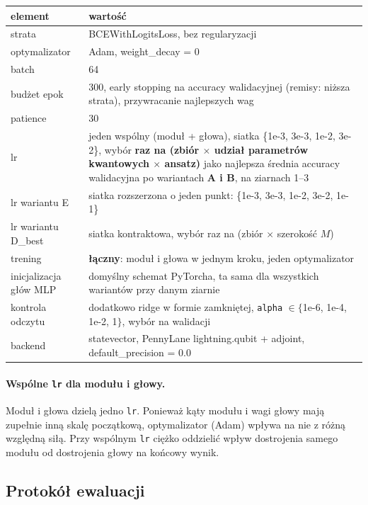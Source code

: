 \documentclass[11pt, a4paper]{article}
\begin{document}
\begin{table}[H]
\centering
\renewcommand{\arraystretch}{1.3}
\begin{tabularx}{\textwidth}{lX}
\toprule
\textbf{element} & \textbf{wartość} \\
\midrule
strata & BCEWithLogitsLoss, bez regularyzacji \\
optymalizator & Adam, weight\_decay = 0 \\
batch & 64 \\
budżet epok & 300, early stopping na accuracy walidacyjnej (remisy: niższa strata), przywracanie najlepszych wag \\
patience & 30 \\
lr & jeden wspólny (moduł + głowa), siatka \{1e-3, 3e-3, 1e-2, 3e-2\}, wybór \textbf{raz na (zbiór $\times$ udział parametrów kwantowych $\times$ ansatz)} jako najlepsza średnia accuracy walidacyjna po wariantach \textbf{A i B}, na ziarnach 1–3 \\
lr wariantu E & siatka rozszerzona o jeden punkt: \{1e-3, 3e-3, 1e-2, 3e-2, 1e-1\}\\
lr wariantu D\_best & siatka kontraktowa, wybór raz na (zbiór $\times$ szerokość $M$) \\
trening & \textbf{łączny}: moduł i głowa w jednym kroku, jeden optymalizator \\
inicjalizacja głów MLP & domyślny schemat PyTorcha, ta sama dla wszystkich wariantów przy danym ziarnie \\
kontrola odczytu & dodatkowo ridge w formie zamkniętej, \texttt{alpha} $\in \{$1e-6, 1e-4, 1e-2, 1$\}$, wybór na walidacji \\
backend & statevector, PennyLane lightning.qubit + adjoint, default\_precision = 0.0 \\
\bottomrule
\end{tabularx}
\end{table}

\paragraph{Wspólne \texttt{lr} dla modułu i głowy.} Moduł i głowa dzielą jedno \texttt{lr}. Ponieważ kąty modułu i wagi głowy mają zupełnie inną skalę początkową, optymalizator (Adam) wpływa na nie z różną względną siłą. Przy wspólnym \texttt{lr} ciężko oddzielić wpływ dostrojenia samego modułu od dostrojenia głowy na końcowy wynik.

\subsection{Protokół ewaluacji}
\end{document}
